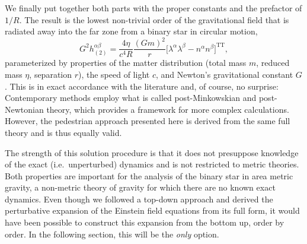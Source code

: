 We finally put together both parts with the proper constants and the prefactor of $1/R$. The result is the lowest non-trivial order of the gravitational field that is radiated away into the far zone from a binary star in circular motion,
\begin{equation}\label{metric_radiation}
  G^2h^{\alpha\beta}_{(2)} = \frac{4\eta}{c^4 R} \frac{(Gm)^2}{r}\lbrack\lambda^\alpha\lambda^\beta - n^\alpha n^\beta\rbrack^\text{TT},
\end{equation}
parameterized by properties of the matter distribution (total mass $m$, reduced mass $\eta$, separation $r$), the speed of light $c$, and Newton's gravitational constant $G$. This is in exact accordance with the literature\cite{poisson2014gravity} and, of course, no surprise: Contemporary methods employ what is called post-Minkowskian and post-Newtonian theory\cite{poisson2014gravity}, which provides a framework for more complex calculations. However, the pedestrian approach presented here is derived from the same full theory and is thus equally valid.

The strength of this solution procedure is that it does not presuppose knowledge of the exact (i.e.~unperturbed) dynamics and is not restricted to metric theories. Both properties are important for the analysis of the binary star in area metric gravity, a non-metric theory of gravity for which there are no known exact dynamics. Even though we followed a top-down approach and derived the perturbative expansion of the Einstein field equations from its full form, it would have been possible to construct this expansion from the bottom up, order by order. In the following section, this will be the \emph{only} option.

